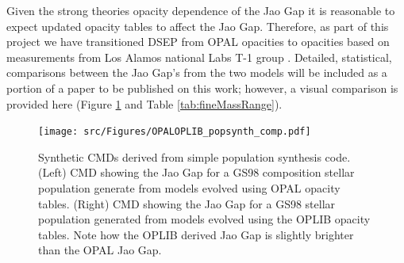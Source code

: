 Given the strong theories opacity dependence of the Jao Gap it is reasonable to
expect updated opacity tables to affect the Jao Gap. Therefore, as part of this
project we have transitioned DSEP from OPAL opacities to opacities based on
measurements from Los Alamos national Labs T-1 group
\citep[OPLIB][]{Colgan2016}. Detailed, statistical, comparisons between the Jao
Gap's from the two models will be included as a portion of a paper to be
published on this work; however, a visual comparison is provided here (Figure
\ref{fig:JaoGapOPALOPLIB} and Table \ref{tab:fineMassRange}).

\begin{figure}
	\centering
	\texttt{[image: src/Figures/OPALOPLIB\_popsynth\_comp.pdf]}
	\caption{Synthetic CMDs derived from simple population synthesis code.
	(Left) CMD showing the Jao Gap for a GS98 composition stellar population
	generate from models evolved using OPAL opacity tables. (Right) CMD showing
	the Jao Gap for a GS98 stellar population generated from models evolved
	using the OPLIB opacity tables. Note how the OPLIB derived Jao Gap is
	slightly brighter than the OPAL Jao Gap.}
	\label{fig:JaoGapOPALOPLIB}
\end{figure}

